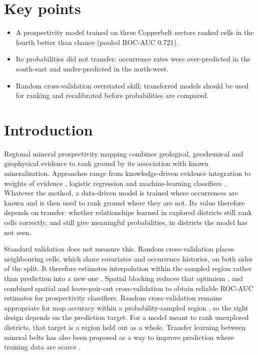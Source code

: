 \documentclass[pdflatex,sn-basic]{sn-jnl}%
\begin{document}
\ifdefined\preprintmode
\else
{}
\fi

\maketitle

\section*{Key points}
\begin{itemize}
\item A prospectivity model trained on three Copperbelt sectors ranked cells in the fourth better than chance (pooled ROC-AUC 0.721).
\item Its probabilities did not transfer: occurrence rates were over-predicted in the south-east and under-predicted in the north-west.
\item Random cross-validation overstated skill; transferred models should be used for ranking and recalibrated before probabilities are compared.
\end{itemize}

\section{Introduction}

Regional mineral prospectivity mapping combines geological, geochemical and geophysical evidence to rank ground by its association with known mineralization. Approaches range from knowledge-driven evidence integration \citep{BonhamCarter1994, Carranza2009} to weights of evidence \citep{BonhamCarter1989}, logistic regression and machine-learning classifiers \citep{Porwal2006, Carranza2015, Ford2019, Yousefi2021, Lawley2022}. Whatever the method, a data-driven model is trained where occurrences are known and is then used to rank ground where they are not. Its value therefore depends on transfer: whether relationships learned in explored districts still rank cells correctly, and still give meaningful probabilities, in districts the model has not seen.

Standard validation does not measure this. Random cross-validation places neighbouring cells, which share covariates and occurrence histories, on both sides of the split. It therefore estimates interpolation within the sampled region rather than prediction into a new one \citep{Brenning2012, Roberts2017}. Spatial blocking reduces that optimism \citep{Valavi2019, Ploton2020}, and \citet{Airola2019} combined spatial and leave-pair-out cross-validation to obtain reliable ROC-AUC estimates for prospectivity classifiers. Random cross-validation remains appropriate for map accuracy within a probability-sampled region \citep{Wadoux2021}, so the right design depends on the prediction target. For a model meant to rank unexplored districts, that target is a region held out as a whole. Transfer learning between mineral belts has also been proposed as a way to improve prediction where training data are scarce \citep{Lauzon2024}.
\end{document}
